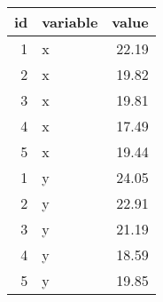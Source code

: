 \begin{tabular}{rlr}
  \toprule
 id & variable & value \\ 
  \midrule
    1 & x & 22.19 \\ 
    2 & x & 19.82 \\ 
    3 & x & 19.81 \\ 
    4 & x & 17.49 \\ 
    5 & x & 19.44 \\ 
    1 & y & 24.05 \\ 
    2 & y & 22.91 \\ 
    3 & y & 21.19 \\ 
    4 & y & 18.59 \\ 
    5 & y & 19.85 \\ 
   \bottomrule
\end{tabular}
